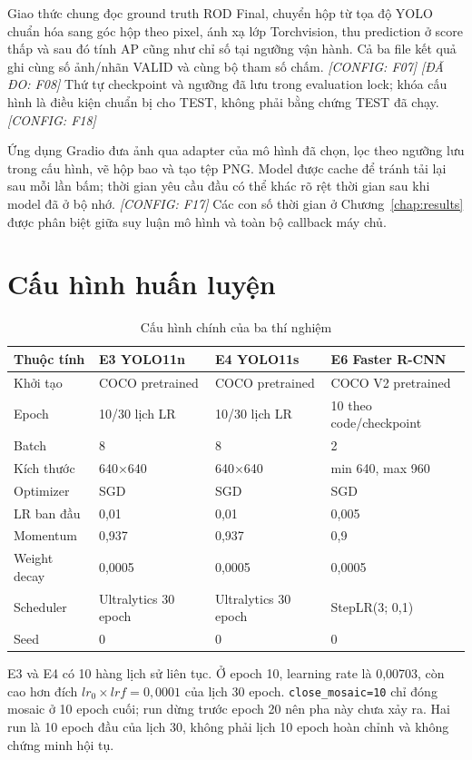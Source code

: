 \documentclass[12pt,a4paper,oneside]{report}
\newcommand{\measured}[1]{\textit{[ĐÃ ĐO: #1]}}
\newcommand{\configured}[1]{\textit{[CONFIG: #1]}}
\begin{document}
Giao thức chung đọc ground truth ROD Final, chuyển hộp từ tọa độ YOLO chuẩn hóa sang góc hộp theo pixel, ánh xạ lớp Torchvision, thu prediction ở score thấp và sau đó tính AP cũng như chỉ số tại ngưỡng vận hành. Cả ba file kết quả ghi cùng số ảnh/nhãn VALID và cùng bộ tham số chấm. \configured{F07} \measured{F08} Thứ tự checkpoint và ngưỡng đã lưu trong evaluation lock; khóa cấu hình là điều kiện chuẩn bị cho TEST, không phải bằng chứng TEST đã chạy. \configured{F18}

Ứng dụng Gradio đưa ảnh qua adapter của mô hình đã chọn, lọc theo ngưỡng lưu trong cấu hình, vẽ hộp bao và tạo tệp PNG. Model được cache để tránh tải lại sau mỗi lần bấm; thời gian yêu cầu đầu có thể khác rõ rệt thời gian sau khi model đã ở bộ nhớ. \configured{F17} Các con số thời gian ở Chương~\ref{chap:results} được phân biệt giữa suy luận mô hình và toàn bộ callback máy chủ.

\section{Cấu hình huấn luyện}
\begin{table}[H]\centering\small
\caption{Cấu hình chính của ba thí nghiệm}\label{tab:traincfg}
\begin{tabular}{p{3.1cm}p{3.3cm}p{3.3cm}p{4.5cm}}\toprule
Thuộc tính & E3 YOLO11n & E4 YOLO11s & E6 Faster R-CNN\\\midrule
Khởi tạo & COCO pretrained & COCO pretrained & COCO V2 pretrained\\
Epoch & 10/30 lịch LR & 10/30 lịch LR & 10 theo code/checkpoint\\
Batch & 8 & 8 & 2\\
Kích thước & 640×640 & 640×640 & min 640, max 960\\
Optimizer & SGD & SGD & SGD\\
LR ban đầu & 0,01 & 0,01 & 0,005\\
Momentum & 0,937 & 0,937 & 0,9\\
Weight decay & 0,0005 & 0,0005 & 0,0005\\
Scheduler & Ultralytics 30 epoch & Ultralytics 30 epoch & StepLR(3; 0,1)\\
Seed & 0 & 0 & 0\\\bottomrule
\end{tabular}
\end{table}

E3 và E4 có 10 hàng lịch sử liên tục. Ở epoch 10, learning rate là 0,00703, còn cao hơn đích $lr_0\times lrf=0,0001$ của lịch 30 epoch. \texttt{close\_mosaic=10} chỉ đóng mosaic ở 10 epoch cuối; run dừng trước epoch 20 nên pha này chưa xảy ra. Hai run là 10 epoch đầu của lịch 30, không phải lịch 10 epoch hoàn chỉnh và không chứng minh hội tụ.
\end{document}

